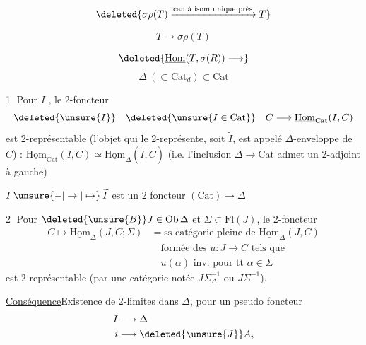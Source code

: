 \[
\deleted{\sigma\rho(T)\xrightarrow{\text{can à isom unique près}}T}
\]

\[
\boxed{T\longrightarrow\sigma\rho(T)}
\]

\[
\deleted{\underline{\mathrm{Hom}}(T,\sigma(R))\longrightarrow}
\]
\[
\Delta\ (\subset\mathrm{Cat}_{d})\subset\mathrm{Cat}
\]

\textcircled{1} Pour $I$ , le 2-foncteur
\[
\deleted{\unsure{I}}\quad\deleted{\unsure{I\in\mathrm{Cat}}}\quad C\longrightarrow\underline{\mathrm{Hom}}_{\mathrm{Cat}}(I,C)
\]
est 2-représentable (l'objet qui le 2-représente, soit $\widetilde I$, est appelé $\Delta$-enveloppe de $C$) : $\underline{\mathrm{Hom}}_{\mathrm{Cat}}(I,C)\simeq\underline{\mathrm{Hom}}_{\Delta}(\widetilde I,C)$
(i.e. l'inclusion $\Delta\longrightarrow\mathrm{Cat}$
admet un 2-adjoint à gauche)

$I\mathbin{\unsure{-|\to|\mapsto}}\widetilde I$ est un 2 foncteur $(\mathrm{Cat})\longrightarrow\Delta$

\textcircled{2} Pour $\deleted{\unsure{B}}J\in\mathrm{Ob}\,\Delta$ et $\Sigma\subset\mathrm{Fl}(J)$, le 2-foncteur
\[
\begin{aligned}
 C\longmapsto\underline{\mathrm{Hom}}_{\Delta}(J,C;\Sigma)
 &=\text{ss-catégorie pleine de }\underline{\mathrm{Hom}}_{\Delta}(J,C)\\
 &\quad\text{formée des }u:J\to C\text{ tels que}\\
 &\quad u(\alpha)\text{ inv. pour tt }\alpha\in\Sigma
\end{aligned}
\]
est 2-représentable (par une catégorie notée $J\Sigma_{\Delta}^{-1}$ ou $J\Sigma^{-1}$).

\uline{Conséquence}\quad Existence de 2-limites  dans $\Delta$, pour un pseudo foncteur
\[
\begin{aligned}
 I&\longrightarrow\Delta\\
 i&\longrightarrow\deleted{\unsure{J}}A_i
\end{aligned}
\]

